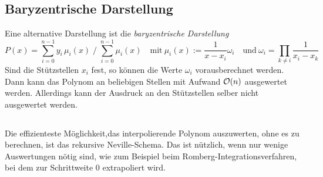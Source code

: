 \subsection{Baryzentrische Darstellung}
%
Eine alternative Darstellung ist die \emph{baryzentrische Darstellung}
\begin{equation}
P(x) = \sum_{i=0}^{n-1} y_i\, \mu_i(x) \; \Big/ \; \sum_{i=0}^{n-1}
\mu_i(x)\quad\text{mit}~
\mu_i(x) := \frac{1}{x-x_i}\omega_i \quad\text{und}~
\omega_i = \prod_{k\neq i}\frac{1}{x_i-x_k}
\end{equation}
Sind die Stützstellen $x_i$ fest, so können die Werte $\omega_i$
vorausberechnet werden. Dann kann das Polynom an beliebigen Stellen
mit Aufwand $\mathcal O(n)$ ausgewertet werden. Allerdings kann der Ausdruck
an den Stützstellen selber nicht ausgewertet werden.

\subsection{}

Die effizienteste Möglichkeit,das interpolierende Polynom auszuwerten,
ohne es zu berechnen, ist das rekursive Neville-Schema. Das ist
nützlich, wenn nur wenige Auswertungen nötig sind, wie zum Beispiel
beim Romberg-Integrationsverfahren, bei dem zur Schrittweite 0
extrapoliert wird.

